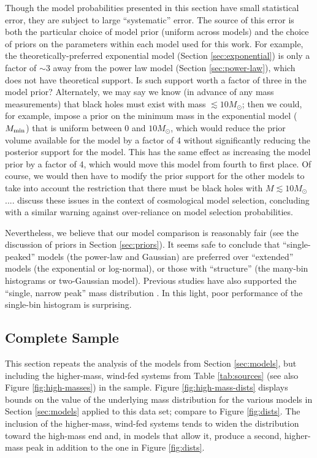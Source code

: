 \documentclass[preprint]{aastex}
\newcommand{\Msun}{M_\odot}
\newcommand{\Mmin}{M_{\textnormal{min}}}
\begin{document}
Though the model probabilities presented in this section have small
statistical error, they are subject to large ``systematic'' error.
The source of this error is both the particular choice of model prior
(uniform across models) and the choice of priors on the parameters
within each model used for this work.  For example, the
theoretically-preferred exponential model (Section
\ref{sec:exponential}) is only a factor of $\sim 3$ away from the
power law model (Section \ref{sec:power-law}), which does not have
theoretical support.  Is such support worth a factor of three in the
model prior?  Alternately, we may say we know (in advance of any mass
measurements) that black holes must exist with mass $\lesssim
10\Msun$; then we could, for example, impose a prior on the minimum
mass in the exponential model ($\Mmin$) that is uniform between $0$
and $10 \Msun$, which would reduce the prior volume available for the
model by a factor of 4 without significantly reducing the posterior
support for the model.  This has the same effect as increasing the
model prior by a factor of 4, which would move this model from fourth
to first place.  Of course, we would then have to modify the prior
support for the other models to take into account the restriction that
there must be black holes with $M \lesssim 10\Msun$....
\citet{Linder2008} discuss these issues in the context of cosmological
model selection, concluding with a similar warning against
over-reliance on model selection probabilities.

Nevertheless, we believe that our model comparison is reasonably fair
(see the discussion of priors in Section \ref{sec:priors}).  It seems
safe to conclude that ``single-peaked'' models (the power-law and
Gaussian) are preferred over ``extended'' models (the exponential or
log-normal), or those with ``structure'' (the many-bin histograms or
two-Gaussian model).  Previous studies have also supported the
``single, narrow peak'' mass distribution \citep{Bailyn1998,Ozel2010}.
In this light, poor performance of the single-bin histogram is
surprising.

\subsection{Complete Sample}
\label{sec:higher-mass}

This section repeats the analysis of the models from Section
\ref{sec:models}, but including the higher-mass, wind-fed systems from
Table \ref{tab:sources} (see also Figure \ref{fig:high-masses}) in the
sample.  Figure \ref{fig:high-mass-dists} displays bounds on the value
of the underlying mass distribution for the various models in Section
\ref{sec:models} applied to this data set; compare to Figure
\ref{fig:dists}.  The inclusion of the higher-mass, wind-fed systems
tends to widen the distribution toward the high-mass end and, in
models that allow it, produce a second, higher-mass peak in addition
to the one in Figure \ref{fig:dists}.
\end{document}
